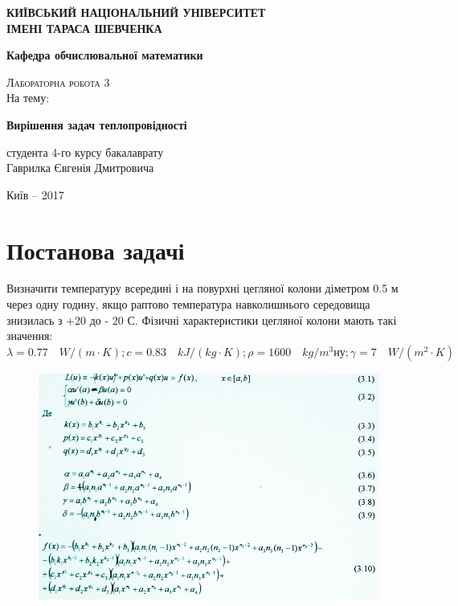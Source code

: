 \documentclass[fontsize=14pt,DIV=1,a4paper]{scrartcl}
\begin{document}
	\begin{titlepage}
		\begin{center}
			\large
			\textbf{КИЇВСЬКИЙ НАЦІОНАЛЬНИЙ УНІВЕРСИТЕТ \\
			ІМЕНІ ТАРАСА ШЕВЧЕНКА}

			\textbf{Кафедра обчислювальної математики}
			
			\vspace{6.0cm}

			\textsc{Лабораторна робота 3}\\
			На тему:

			\textbf{ Вирішення задач теплопровідності }
			\bigskip
		\end{center}
		\vfill

		\hfill
		\begin{minipage}{0.6\textwidth}
			студента 4-го курсу бакалаврату\\
			Гаврилка Євгенія Дмитровича
		\end{minipage}%
		\vfill
		
		\vspace{-2.5cm}
		
		

		\vspace{1.0cm}

		\begin{center}
			Київ – 2017
		\end{center}
	\end{titlepage}
	
	\tableofcontents

	\newpage
	\section*{Постанова задачі}
	Визначити температуру всередині і на повурхні цегляної колони діметром 0.5 м через одну годину, якщо раптово температура навколишнього середовища знизилась з +20 до - 20 С. Фізичні характеристики цегляної колони мають такі значення: $\lambda = 0.77\quad W/(m \cdot K); c= 0.83\quad kJ/(kg \cdot K); \rho = 1600 \quad kg/m^3ну ; \gamma = 7 \quad W/(m^2 \cdot K) $
	\begin{figure}[h!]
		\includegraphics[scale=0.5]{stand.png}
		\centering
	\end{figure}
	
\end{document}
